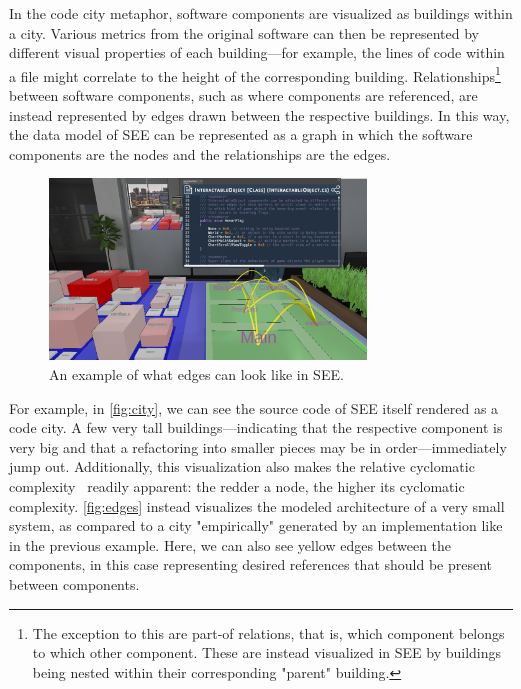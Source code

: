 \documentclass{scrartcl}
\newcommand{\SEE}{\textsc{SEE}}
\begin{document}
In the code city metaphor, software components are visualized as buildings within a city.
Various metrics from the original software can then be represented by different visual properties of each building---for example, the lines of code within a file might correlate to the height of the corresponding building.
Relationships\footnote{
  The exception to this are part-of relations, that is, which component belongs to which other component.
  These are instead visualized in \SEE{} by buildings being nested within their corresponding "parent" building.
} between software components, such as where components are referenced, are instead represented by edges drawn between the respective buildings.
In this way, the data model of \SEE{} can be represented as a graph in which the software components are the nodes and the relationships are the edges.

\begin{figure}
  \begin{center}
    \includegraphics[width=0.75\textwidth,trim={35cm 0 0 20cm},clip]{figures/SEE_readme}
  \end{center}
  \caption{An example of what edges can look like in \SEE{}.}\label{fig:edges}
\end{figure}


For example, in \autoref{fig:city}, we can see the source code of \SEE{} itself rendered as a code city.
A few very tall buildings---indicating that the respective component is very big and that a refactoring into smaller pieces may be in order---immediately jump out.
Additionally, this visualization also makes the relative cyclomatic complexity~\cite{mccabe} readily apparent:
the redder a node, the higher its cyclomatic complexity.
\autoref{fig:edges} instead visualizes the modeled architecture of a very small system, as compared to a city "empirically" generated by an implementation like in the previous example.
Here, we can also see yellow edges between the components, in this case representing desired references that should be present between components.
\end{document}
